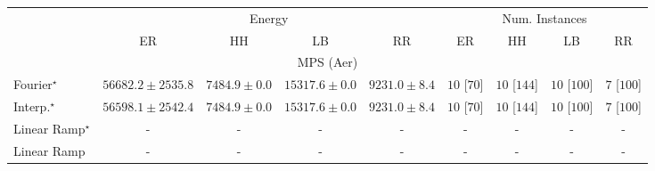 \begin{tabular}{l|cccc|cccc|}
\toprule
& \multicolumn{4}{c|}{Energy} & \multicolumn{4}{c|}{Num. Instances} \\
            & ER & HH & LB & RR & ER & HH & LB & RR \\
\midrule
\multicolumn{9}{c}{\rule{0pt}{8pt}MPS (Aer)} \\
\midrule
Fourier$^\star$ & {\cellcolor[HTML]{4D004B}} \color[HTML]{F1F1F1} $56682.2\pm 2535.8$ & {\cellcolor[HTML]{F5FAFC}} \color[HTML]{000000} $7484.9\pm 0.0$ & {\cellcolor[HTML]{D4E3EF}} \color[HTML]{000000} $15317.6\pm 0.0$ & {\cellcolor[HTML]{EEF6FA}} \color[HTML]{000000} $9231.0\pm 8.4$ & {\cellcolor[HTML]{49006A}} \color[HTML]{F1F1F1} $10$ [$70$] & {\cellcolor[HTML]{49006A}} \color[HTML]{F1F1F1} $10$ [$144$] & {\cellcolor[HTML]{49006A}} \color[HTML]{F1F1F1} $10$ [$100$] & {\cellcolor[HTML]{CD238F}} \color[HTML]{F1F1F1} $7$ [$100$] \\
Interp.$^\star$ & {\cellcolor[HTML]{4D004B}} \color[HTML]{F1F1F1} $56598.1\pm 2542.4$ & {\cellcolor[HTML]{F5FAFC}} \color[HTML]{000000} $7484.9\pm 0.0$ & {\cellcolor[HTML]{D4E3EF}} \color[HTML]{000000} $15317.6\pm 0.0$ & {\cellcolor[HTML]{EEF6FA}} \color[HTML]{000000} $9231.0\pm 8.4$ & {\cellcolor[HTML]{49006A}} \color[HTML]{F1F1F1} $10$ [$70$] & {\cellcolor[HTML]{49006A}} \color[HTML]{F1F1F1} $10$ [$144$] & {\cellcolor[HTML]{49006A}} \color[HTML]{F1F1F1} $10$ [$100$] & {\cellcolor[HTML]{CD238F}} \color[HTML]{F1F1F1} $7$ [$100$] \\
Linear Ramp$^\star$ & {\cellcolor[HTML]{000000}} \color[HTML]{F1F1F1} {\cellcolor{white}} \color{black} - & {\cellcolor[HTML]{000000}} \color[HTML]{F1F1F1} {\cellcolor{white}} \color{black} - & {\cellcolor[HTML]{000000}} \color[HTML]{F1F1F1} {\cellcolor{white}} \color{black} - & {\cellcolor[HTML]{000000}} \color[HTML]{F1F1F1} {\cellcolor{white}} \color{black} - & {\cellcolor[HTML]{000000}} \color[HTML]{F1F1F1} {\cellcolor{white}} \color{black} - & {\cellcolor[HTML]{000000}} \color[HTML]{F1F1F1} {\cellcolor{white}} \color{black} - & {\cellcolor[HTML]{000000}} \color[HTML]{F1F1F1} {\cellcolor{white}} \color{black} - & {\cellcolor[HTML]{000000}} \color[HTML]{F1F1F1} {\cellcolor{white}} \color{black} - \\
Linear Ramp & {\cellcolor[HTML]{000000}} \color[HTML]{F1F1F1} {\cellcolor{white}} \color{black} - & {\cellcolor[HTML]{000000}} \color[HTML]{F1F1F1} {\cellcolor{white}} \color{black} - & {\cellcolor[HTML]{000000}} \color[HTML]{F1F1F1} {\cellcolor{white}} \color{black} - & {\cellcolor[HTML]{000000}} \color[HTML]{F1F1F1} {\cellcolor{white}} \color{black} - & {\cellcolor[HTML]{000000}} \color[HTML]{F1F1F1} {\cellcolor{white}} \color{black} - & {\cellcolor[HTML]{000000}} \color[HTML]{F1F1F1} {\cellcolor{white}} \color{black} - & {\cellcolor[HTML]{000000}} \color[HTML]{F1F1F1} {\cellcolor{white}} \color{black} - & {\cellcolor[HTML]{000000}} \color[HTML]{F1F1F1} {\cellcolor{white}} \color{black} - \\

\end{tabular}
